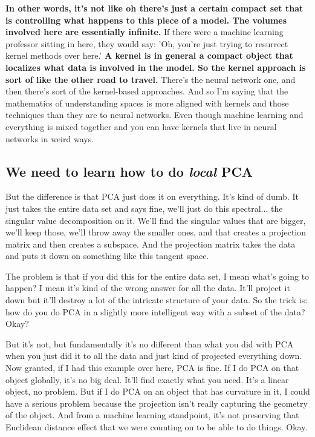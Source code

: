 \textbf{In other words, it's not like oh there's just a certain compact set that is controlling what happens to this piece of a model. The volumes involved here are essentially infinite.}
\medskip \newline
If there were a machine learning professor sitting in here, they would say: 'Oh, you're just trying to resurrect kernel methods over here.'  \textbf{A kernel is in general a compact object that localizes what data is involved in the model. So the kernel approach is sort of like the other road to travel.}
There's the neural network one, and then there's sort of the kernel-based approaches. And so I'm saying that the mathematics of understanding spaces is more aligned with kernels and those techniques than they are to neural networks. Even though machine learning and everything is mixed together and you can have kernels that live in neural networks in weird ways.
\medskip \newline


\subsection{We need to learn how to do \textit{local} PCA}


But the difference is that PCA just does it on everything. It's kind of dumb. It just takes the entire data set and says fine, we'll just do this spectral... the singular value decomposition on it. We'll find the singular values that are bigger, we'll keep those, we'll throw away the smaller ones, and that creates a projection matrix and then creates a subspace. And the projection matrix takes the data and puts it down on something like this tangent space. 

The problem is that if you did this for the entire data set, I mean what's going to happen? I mean it's kind of the wrong answer for all the data. It'll project it down but it'll destroy a lot of the intricate structure of your data. So the trick is: how do you do PCA in a slightly more intelligent way with a subset of the data? Okay? 

But it's not, but fundamentally it's no different than what you did with PCA when you just did it to all the data and just kind of projected everything down. Now granted, if I had this example over here, PCA is fine. If I do PCA on that object globally, it's no big deal. It'll find exactly what you need. It's a linear object, no problem. But if I do PCA on an object that has curvature in it, I could have a serious problem because the projection isn't really capturing the geometry of the object. And from a machine learning standpoint, it's not preserving that Euclidean distance effect that we were counting on to be able to do things. Okay. 



